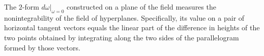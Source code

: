 The $2$-form $d\omega|_{\omega=0}$ constructed on a plane of the field measures the nonintegrability of the field of hyperplanes. Specifically, its value on a pair of horizontal tangent vectors equals the linear part of the difference in heights of the two points obtained by integrating along the two sides of the parallelogram formed by those vectors.
